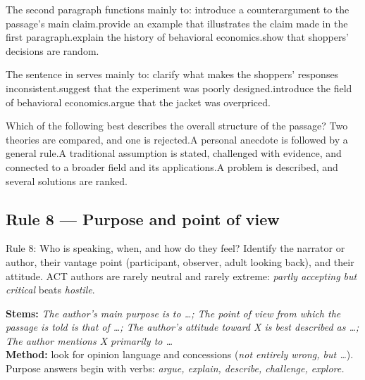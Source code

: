 \documentclass[11pt]{article}
\begin{document}
{The second paragraph functions mainly to:}
{introduce a counterargument to the passage's main claim.}{provide an example that illustrates the claim made in the first paragraph.}{explain the history of behavioral economics.}{show that shoppers' decisions are random.}

{The sentence in  serves mainly to:}
{clarify what makes the shoppers' responses inconsistent.}{suggest that the experiment was poorly designed.}{introduce the field of behavioral economics.}{argue that the jacket was overpriced.}

{Which of the following best describes the overall structure of the passage?}
{Two theories are compared, and one is rejected.}{A personal anecdote is followed by a general rule.}{A traditional assumption is stated, challenged with evidence, and connected to a broader field and its applications.}{A problem is described, and several solutions are ranked.}

\subsection{Rule 8 --- Purpose and point of view}
\begin{rulebox}{Rule 8: Who is speaking, when, and how do they feel?}
Identify the narrator or author, their vantage point (participant, observer, adult looking back), and their attitude. ACT authors are rarely neutral and rarely extreme: \emph{partly accepting but critical} beats \emph{hostile}.
\end{rulebox}
\textbf{Stems:} \emph{The author's main purpose is to \dots; The point of view from which the passage is told is that of \dots; The author's attitude toward X is best described as \dots; The author mentions X primarily to \dots}\\
\textbf{Method:} look for opinion language and concessions (\emph{not entirely wrong, but \dots}). Purpose answers begin with verbs: \emph{argue, explain, describe, challenge, explore.}
\end{document}

